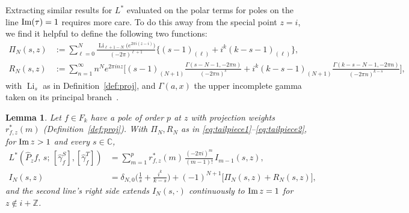 \documentclass[11pt]{article}
\newtheorem{lemma}[theorem]{Lemma}
\newcommand{\ZZ}{\mathbb{Z}}
\newcommand{\CC}{\mathbb{C}}
\DeclareMathOperator{\Li}{Li}
\begin{document}
Extracting similar results for $L^*$ evaluated on the polar terms for poles on the line
${\rm Im}(\tau) = 1$ requires more care. To do this away from the special point $z = i$, we
find it helpful to define the following two functions:
\begin{align}
\Pi_N(s,z)&:=\sum_{\ell=0}^{N}\frac{\Li_{\ell+1-N}\big(e^{2\pi i(z-i)}\big)}{(-2\pi)^{\ell+1}} \big\{ (s-1)_{(\ell)}+i^k(k-s-1)_{(\ell)} \big\},\label{eq:tailpiece1}\\
R_N(s,z)&:=\sum_{n=1}^{\infty}n^N e^{2\pi inz}\Big[(s{-}1)_{(N{+}1)}\tfrac{\Gamma(s{-}N{-}1,{-}2\pi n)}{(-2\pi n)^{s}}
+i^k(k{-}s{-}1)_{(N{+}1)}\tfrac{\Gamma(k{-}s{-}N{-}1,{-}2\pi n)}{(-2\pi n)^{k-s}}\Big], \label{eq:tailpiece2}
\end{align}
with $\Li_s$ as in Definition~\ref{def:proj}, and $\Gamma(a,x)$ the upper incomplete gamma taken on
its principal branch~\cite{DLMF}.

\begin{lemma}\label{lem:polylogedge}
Let $f\in F_k$ have a pole of order $p$ at $z$ with projection weights $r^*_{f,z}(m)$
(Definition~\ref{def:proj}). With $\Pi_N,R_N$ as in \eqref{eq:tailpiece1}--\eqref{eq:tailpiece2},
for ${\rm Im}\,z>1$ and every $s\in\CC$,
\begin{align}
L^*(\widehat P_z f,\,s;\,[\hat\gamma_f^S],[\hat\gamma_f^T])&=\sum_{m=1}^{p} r^*_{f,z}(m)\,\frac{(-2\pi i)^m}{(m-1)!}\,I_{m-1}(s,z),\label{eq:lem4.13.whole.z}\\
I_N(s,z)&=\delta_{N,0}\Big(\tfrac1s+\tfrac{i^k}{k-s}\Big)
+(-1)^{N+1}\big[\Pi_N(s, z)+R_N(s, z)\big],\label{eq:twolayer}
\end{align}
and the second line's right side extends $I_N(s,\cdot)$ continuously to ${\rm Im}\,z=1$ for
$z\notin i+\ZZ$.
\end{lemma}
\end{document}
